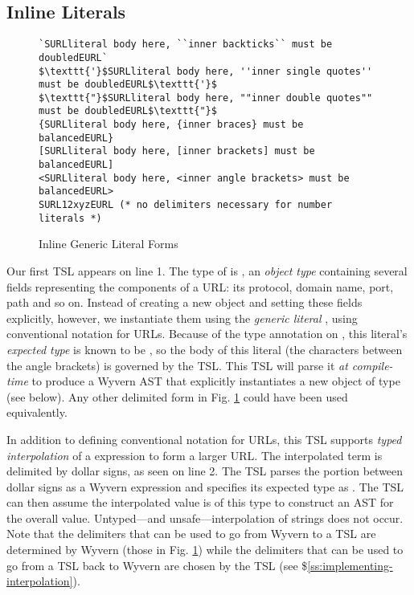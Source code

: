 \subsection{Inline Literals}
\begin{figure}[t]
\begin{lstlisting}
`SURLliteral body here, ``inner backticks`` must be doubledEURL`
$\texttt{'}$SURLliteral body here, ''inner single quotes'' must be doubledEURL$\texttt{'}$
$\texttt{"}$SURLliteral body here, ""inner double quotes"" must be doubledEURL$\texttt{"}$
{SURLliteral body here, {inner braces} must be balancedEURL}
[SURLliteral body here, [inner brackets] must be balancedEURL]
<SURLliteral body here, <inner angle brackets> must be balancedEURL>
SURL12xyzEURL (* no delimiters necessary for number literals *)
\end{lstlisting}
\vspace{-8px}
\caption{Inline Generic Literal Forms}
\vspace{-10px}
\label{f-delims}
\end{figure}
Our first TSL appears on line 1. The type of  is , an \emph{object type} containing several fields representing the components of a URL: its protocol, domain name, port, path and so on. Instead of creating a new object and setting these fields explicitly, however, we instantiate them using the \emph{generic literal} , using conventional notation for URLs. Because of the type annotation on , this literal's \emph{expected type} is known to be , so the body of this literal (the characters between the angle brackets) is governed by the  TSL. This TSL will parse it \emph{at compile-time} to produce a Wyvern AST that explicitly instantiates a new object of type   (see below). Any other delimited form in Fig. \ref{f-delims} could have been used equivalently.

In addition to defining conventional notation for URLs, this TSL supports \emph{typed interpolation}
of a  expression to form a larger URL. The interpolated term is delimited by dollar signs,
as seen on line 2. The TSL parses the portion between dollar signs as a Wyvern expression and
specifies its expected type as  . The TSL can then assume the interpolated value is of this
type to construct an AST for the overall value. Untyped---and unsafe---interpolation of strings
does not occur. Note that the delimiters that can be used to go from Wyvern to a TSL are determined by Wyvern (those in Fig. \ref{f-delims}) while the delimiters that can be used to go from a TSL back to Wyvern are chosen by the TSL (see \$\ref{ss:implementing-interpolation}).

